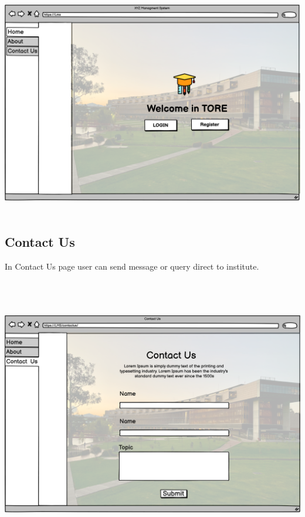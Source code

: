 \includegraphics[width=15cm, height=10cm]{HW_1/images/New Wireframe 1.png}


\subsection{Contact Us}
\caption{In Contact Us page user can send message or query direct to institute.}
\\
\includegraphics[width=18cm, height=11cm]{HW_1/images/New Wireframe 3.png}

